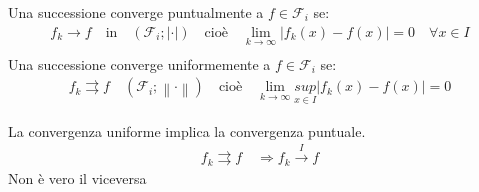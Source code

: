 \documentclass[a4paper, oneside]{article}
\begin{document}
\begin{definition}
  Una successione converge puntualmente a $f \in \mathcal{F}_i$ se:
  \begin{gather*}
    f_k \to f \quad \text{in} \quad (\mathcal{F}_i ; | \cdot |) \quad \text{cioè} \quad \lim_{k \to \infty} |f_k(x) - f(x)| = 0 \quad \forall x \in I\\
  \end{gather*}
  Una successione converge uniformemente a $f \in \mathcal{F}_i$ se:
  \begin{gather*}
    f_k \rightrightarrows f \quad (\mathcal{F}_i ; \left\lVert \cdot \right\rVert ) \quad \text{cioè} \quad \lim_{k \to \infty} \underset{x \in I}{sup}\left\lvert f_k(x) - f(x) \right\rvert = 0
  \end{gather*}
\end{definition}

\begin{observation}
  La convergenza uniforme implica la convergenza puntuale.\\
  \begin{gather*}
    f_k \rightrightarrows  f \quad \Rightarrow f_k \overset{I}{\to} f
  \end{gather*}
  Non è vero il viceversa
\end{observation}
\end{document}
